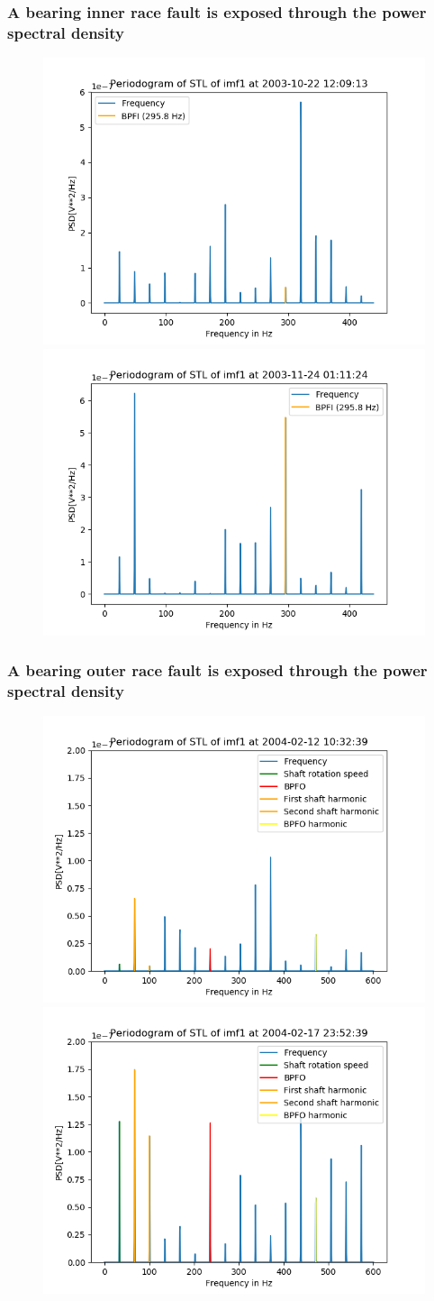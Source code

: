 \documentclass{beamer}
\begin{document}
\begin{frame}
	\frametitle{A bearing inner race fault is exposed through the power spectral density }
	
	\begin{figure}[H]
		\centering
		\includegraphics[width=0.45\linewidth]{start_imf1_bpfi}
		\includegraphics[width=0.45\linewidth]{end_imf1_bpfi}
	\end{figure}
\end{frame}





\begin{frame}
	\frametitle{A bearing outer race fault is exposed through the power spectral density }

	\begin{figure}[H]
		\centering
		\includegraphics[width=0.45\linewidth]{start_imf1_bpfo}
		\includegraphics[width=0.45\linewidth]{end_imf1_bpfo}
	\end{figure}
\end{frame}
\end{document}

